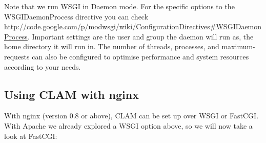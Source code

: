 \documentclass[a4paper,12pt]{report}
\begin{document}
Note that we run WSGI in Daemon mode. For the specific options to the WSGIDaemonProcess directive you can check \url{http://code.google.com/p/modwsgi/wiki/ConfigurationDirectives\#WSGIDaemonProcess}. Important settings are the user and group the daemon will run as, the home directory it will run in. The number of threads, processes, and maximum-requests can also be configured to optimise performance and system resources according to your needs.


\subsection{Using CLAM with nginx}

With nginx (version 0.8 or above), CLAM can be set up over WSGI or FastCGI. With Apache we already explored a WSGI option above, so we will now take a look at FastCGI:
\end{document}
